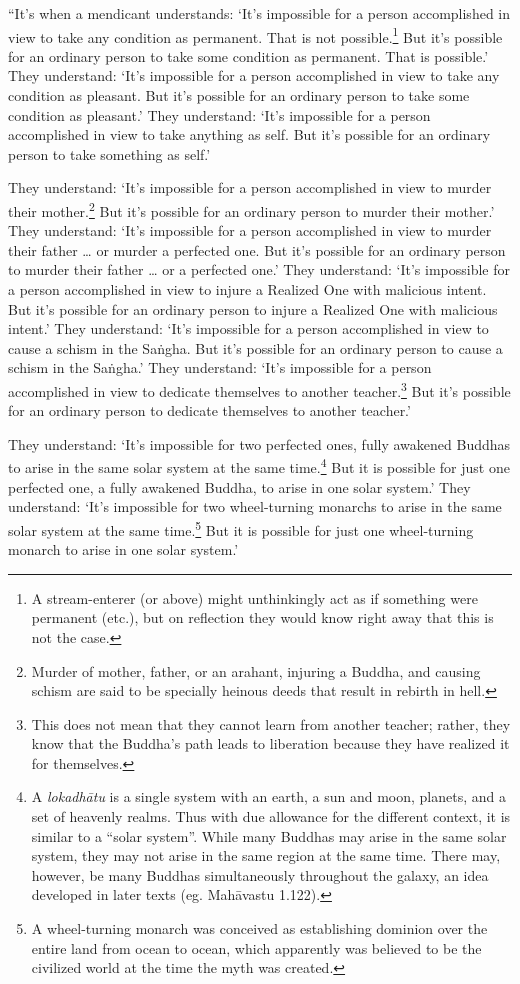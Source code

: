 \documentclass[12pt,openany]{book}%
\begin{document}
“It’s when a mendicant understands: ‘It’s impossible for a person accomplished in view to take any condition as permanent. That is not possible.\footnote{A stream-enterer (or above) might unthinkingly act as if something were permanent (etc.), but on reflection they would know right away that this is not the case. } But it’s possible for an ordinary person to take some condition as permanent. That is possible.’ They understand: ‘It’s impossible for a person accomplished in view to take any condition as pleasant. But it’s possible for an ordinary person to take some condition as pleasant.’ They understand: ‘It’s impossible for a person accomplished in view to take anything as self. But it’s possible for an ordinary person to take something as self.’ 

They understand: ‘It’s impossible for a person accomplished in view to murder their mother.\footnote{Murder of mother, father, or an arahant, injuring a Buddha, and causing schism are said to be specially heinous deeds that result in rebirth in hell. } But it’s possible for an ordinary person to murder their mother.’ They understand: ‘It’s impossible for a person accomplished in view to murder their father … or murder a perfected one. But it’s possible for an ordinary person to murder their father … or a perfected one.’ They understand: ‘It’s impossible for a person accomplished in view to injure a Realized One with malicious intent. But it’s possible for an ordinary person to injure a Realized One with malicious intent.’ They understand: ‘It’s impossible for a person accomplished in view to cause a schism in the \textsanskrit{Saṅgha}. But it’s possible for an ordinary person to cause a schism in the \textsanskrit{Saṅgha}.’ They understand: ‘It’s impossible for a person accomplished in view to dedicate themselves to another teacher.\footnote{This does not mean that they cannot learn from another teacher; rather, they know that the Buddha’s path leads to liberation because they have realized it for themselves. } But it’s possible for an ordinary person to dedicate themselves to another teacher.’ 

They understand: ‘It’s impossible for two perfected ones, fully awakened Buddhas to arise in the same solar system at the same time.\footnote{A \textit{\textsanskrit{lokadhātu}} is a single system with an earth, a sun and moon, planets, and a set of heavenly realms. Thus with due allowance for the different context, it is similar to a “solar system”. While many Buddhas may arise in the same solar system, they may not arise in the same region at the same time. There may, however, be many Buddhas simultaneously throughout the galaxy, an idea developed in later texts (eg. \textsanskrit{Mahāvastu} 1.122). } But it is possible for just one perfected one, a fully awakened Buddha, to arise in one solar system.’ They understand: ‘It’s impossible for two wheel-turning monarchs to arise in the same solar system at the same time.\footnote{A wheel-turning monarch was conceived as establishing dominion over the entire land from ocean to ocean, which apparently was believed to be the civilized world at the time the myth was created. } But it is possible for just one wheel-turning monarch to arise in one solar system.’ 
\end{document}
